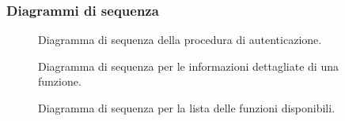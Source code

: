 \subsubsection{Diagrammi di sequenza}
\begin{figure}[H]
	\noindent
	\caption{Diagramma di sequenza della procedura di autenticazione.}
\end{figure}
\begin{figure}[H]
	\noindent
	\caption{Diagramma di sequenza per le informazioni dettagliate di una funzione.}
\end{figure}
\begin{figure}[H]
	\noindent
	\caption{Diagramma di sequenza per la lista delle funzioni disponibili.}
\end{figure}
